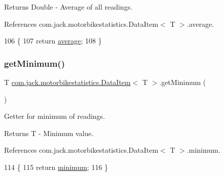 \begin{DoxyReturn}{Returns}
Double -\/ Average of all readings. 
\end{DoxyReturn}


References com.\+jack.\+motorbikestatistics.\+Data\+Item$<$ T $>$.\+average.


\begin{DoxyCode}
106                                \{
107         \textcolor{keywordflow}{return} \hyperlink{classcom_1_1jack_1_1motorbikestatistics_1_1_data_item_a720fe4f7fa02578cc8e0a59ef784746d}{average};
108     \}
\end{DoxyCode}
\mbox{\label{classcom_1_1jack_1_1motorbikestatistics_1_1_data_item_a45cdf3ef773c9c1e69d12861deaccec0}} 
\subsubsection{\texorpdfstring{get\+Minimum()}{getMinimum()}}
{\footnotesize\ttfamily T \hyperlink{classcom_1_1jack_1_1motorbikestatistics_1_1_data_item}{com.\+jack.\+motorbikestatistics.\+Data\+Item}$<$ T $>$.get\+Minimum (\begin{DoxyParamCaption}{ }\end{DoxyParamCaption})\hspace{0.3cm}{\ttfamily [inline]}}



Getter for minimum of readings. 

\begin{DoxyReturn}{Returns}
T -\/ Minimum value. 
\end{DoxyReturn}


References com.\+jack.\+motorbikestatistics.\+Data\+Item$<$ T $>$.\+minimum.


\begin{DoxyCode}
114                           \{
115         \textcolor{keywordflow}{return} \hyperlink{classcom_1_1jack_1_1motorbikestatistics_1_1_data_item_a770342aaa7248e9687517864d73f0009}{minimum};
116     \}
\end{DoxyCode}
\mbox{\label{classcom_1_1jack_1_1motorbikestatistics_1_1_data_item_a5d58df64d90e56c7bb7e8aa8bf49aa0f}} 
